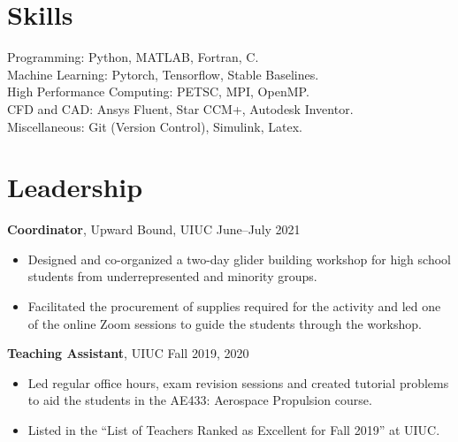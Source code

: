 \documentclass[margin]{res}
\begin{document}
\begin{resume}

\section{\large Skills}		 
Programming: Python, MATLAB, Fortran, C.\\
Machine Learning: Pytorch, Tensorflow, Stable Baselines.\\
High Performance Computing: PETSC, MPI, OpenMP.\\
CFD and CAD: Ansys Fluent, Star CCM+, Autodesk Inventor.\\ 
Miscellaneous: Git (Version Control), Simulink, Latex.

\section{\large Leadership}
{\bf Coordinator}, Upward Bound, UIUC \hfill June--July 2021
\begin{itemize}
	\item Designed and co-organized a two-day glider building workshop for high school students from underrepresented and minority groups.
	\item Facilitated the procurement of supplies required for the activity and led one of the online Zoom sessions to guide the students through the workshop.
\end{itemize}

{\bf Teaching Assistant}, UIUC \hfill Fall 2019, 2020
\begin{itemize}
	\item Led regular office hours, exam revision sessions and created tutorial problems to aid the students in the AE433: Aerospace Propulsion course.
	\item Listed in the ``List of Teachers Ranked as Excellent for Fall 2019'' at UIUC.
\end{itemize}



\end{resume}
\end{document}
